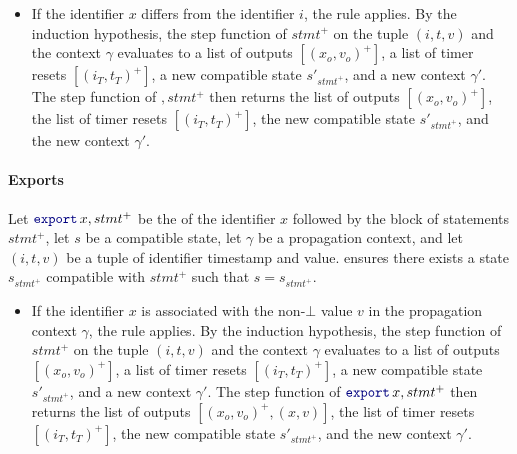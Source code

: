\begin{skippableproof}
\begin{itemize}
        \item If the identifier $x$ differs from the identifier $i$, the rule  applies.
              By the induction hypothesis, the step function of $stmt^+$ on the tuple $(i, t, v)$
              and the context $\gamma$ evaluates to a list of outputs
              $[(x_o, v_o)^+]$, a list of timer resets $[(i_T, t_T)^+]$, a new compatible state
              $s'_{stmt^+}$, and a new context $\gamma'$.
              The step function of $, stmt^+$ then returns the list of outputs
              $[(x_o, v_o)^+]$, the list of timer resets $[(i_T, t_T)^+]$, the new compatible state
              $s'_{stmt^+}$, and the new context $\gamma'$.
    \end{itemize}

    \paragraph{Exports}
    Let $\export{x}, stmt^+$ be the  of the identifier $x$ followed by the block
    of statements $stmt^+$, let $s$ be a compatible state, let $\gamma$ be a propagation context,
    and let $(i, t, v)$ be a tuple of identifier timestamp and value.
     ensures there exists a state $s_{stmt^+}$
    compatible with $stmt^+$ such that $s = s_{stmt^+}$.

    \begin{itemize}
        \item If the identifier $x$ is associated with the non-$\bot$ value $v$ in the propagation
              context $\gamma$, the rule 
              applies.
              By the induction hypothesis, the step function of $stmt^+$ on the tuple $(i, t, v)$
              and the context $\gamma$ evaluates to a list of outputs
              $[(x_o, v_o)^+]$, a list of timer resets $[(i_T, t_T)^+]$, a new compatible state
              $s'_{stmt^+}$, and a new context $\gamma'$.
              The step function of $\export{x}, stmt^+$ then returns the list of outputs
              $[(x_o, v_o)^+, (x, v)]$, the list of timer resets $[(i_T, t_T)^+]$, the new
              compatible state $s'_{stmt^+}$, and the new context $\gamma'$.


\end{itemize}
\end{skippableproof}
